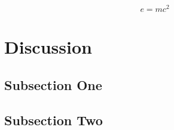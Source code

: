 \documentclass[twoside]{article}
\begin{document}
\lipsum[5] %

\begin{equation}
\label{eq:emc}
e = mc^2
\end{equation}

\lipsum[6] %


\section{Discussion}

\subsection{Subsection One}

\lipsum[7] %

\subsection{Subsection Two}

\lipsum[8] %


%
% 



%





%
\end{document}
